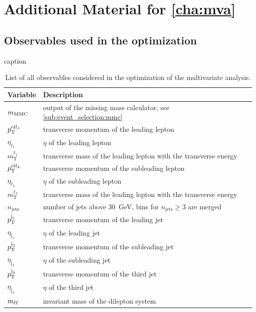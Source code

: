 \chapter{Additional Material for \cref*{cha:mva}}\label{cha:appendix_mva}

\section{Observables used in the optimization}\label{app:mva:fulllistvars}

\begin{table}[htpb]
    \centering
    \caption{caption}
	\caption{List of all observables considered in the optimization of the multivariate analysis.}
    \begin{tabular}{ll}
    \toprule
	  Variable & Description \\
    \midrule
    $m_\text{MMC}$ & output of the missing mass calculator, see \cref{sub:event_selection:mmc} \\ \midrule
    $p_\text{T}^{ell_1}$           & transverse momentum of the leading lepton \\
    $\eta_{\ell_1}$         & $\eta$ of the leading lepton \\
    $m_\text{T}^{\ell_1}$   & transverse mass of the leading lepton with the transverse energy \\
    $p_\text{T}^{ell_2}$           & transverse momentum of the subleading lepton \\
    $\eta_{\ell_2}$         & $\eta$ of the subleading lepton \\
    $m_\text{T}^{\ell_2}$   & transverse mass of the leading lepton with the transverse energy \\
    $n_\text{jets}$         & number of jets above \SI{30}{\GeV}, bins for $n_\text{jets} \geq 3$ are merged\\
    $p_\text{T}^{\text{j}_1}$      & transverse momentum of the leading jet \\
    $\eta_{\text{j}_1}$     & $\eta$ of the leading jet \\
    $p_\text{T}^{\text{j}_2}$      & transverse momentum of the subleading jet \\
    $\eta_{\text{j}_2}$     & $\eta$ of the subleading jet \\
    $p_\text{T}^{\text{j}_3}$      & transverse momentum of the third jet \\
    $\eta_{\text{j}_3}$     & $\eta$ of the third jet \\
    $m_{\ell\ell}$                  & invariant mass of the dilepton system \\

\end{tabular}
\end{table}
